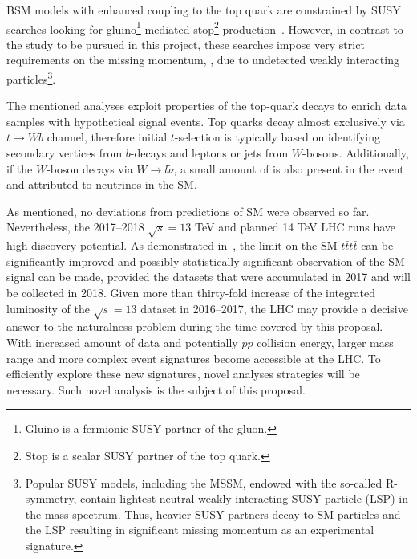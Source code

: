\textcolor{\mycolor}{
BSM models with enhanced coupling to the top quark are constrained by SUSY searches looking for gluino\footnote{Gluino is a fermionic SUSY partner of the gluon.}-mediated stop\footnote{Stop is a scalar SUSY partner of the top quark.} production~\cite{Sirunyan:2017uyt}. However, in contrast to the study to be pursued in this project, these searches impose very strict requirements on the missing momentum, \misspt, due to undetected weakly interacting particles\footnote{Popular SUSY models, including the MSSM, endowed with the so-called R-symmetry, contain lightest neutral weakly-interacting SUSY particle (LSP) in the mass spectrum. Thus, heavier SUSY partners decay to SM particles and the LSP resulting in significant missing momentum as an experimental signature.}.}

\textcolor{\mycolor}{
The mentioned analyses exploit properties of the top-quark decays to enrich data samples with hypothetical signal events. Top quarks decay almost exclusively via $t \rightarrow Wb$ channel, therefore initial $t$-selection is typically based on identifying secondary vertices from $b$-decays and leptons or jets from $W$-bosons. Additionally, if the $W$-boson decays via $W\rightarrow l\tilde{\nu}$, a small amount of \misspt is also present in the event and attributed to neutrinos in the SM. }

\textcolor{\mycolor}{
As mentioned, no deviations from predictions of SM were observed so far. Nevertheless, the 2017--2018 $\sqrt{s}=13$ TeV and planned 14 TeV LHC runs have high discovery potential. As demonstrated in~\cite{Sirunyan:2017tep}, the limit on the SM $t\bar{t}t\bar{t}$ can be significantly improved and possibly statistically significant observation of the SM signal can be made, provided the datasets that were accumulated in 2017 and will be collected in 2018. 
Given more than thirty-fold increase of the integrated luminosity of the $\sqrt{s}=13$ dataset in 2016--2017, the LHC may provide a decisive answer to the naturalness problem during the time covered by this proposal. With increased amount of data and potentially $pp$ collision energy, larger mass range and more complex event signatures become accessible at the LHC. To efficiently explore these new signatures, novel analyses strategies will be necessary. Such novel analysis is the subject of this proposal.}

